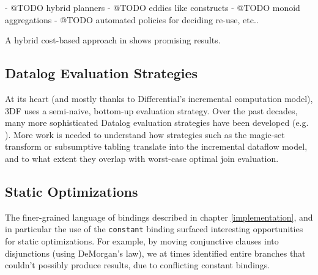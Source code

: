 \documentclass[../index.tex]{subfiles}
\begin{document}
- @TODO hybrid planners
- @TODO eddies like constructs
- @TODO monoid aggregations
- @TODO automated policies for deciding re-use, etc..

A hybrid cost-based approach in \cite{mhedhbi2019optimizing} shows
promising results.

\subsection{Datalog Evaluation Strategies}

At its heart (and mostly thanks to Differential's incremental
computation model), 3DF uses a semi-naive, bottom-up evaluation
strategy. Over the past decades, many more sophisticated Datalog
evaluation strategies have been developed
(e.g. \cite{tekle2011more}). More work is needed to understand how
strategies such as the magic-set transform or subsumptive tabling
translate into the incremental dataflow model, and to what extent they
overlap with worst-case optimal join evaluation.

\subsection{Static Optimizations}

The finer-grained language of bindings described in chapter
\ref{implementation}, and in particular the use of the
\texttt{constant} binding surfaced interesting opportunities for
static optimizations. For example, by moving conjunctive clauses into
disjunctions (using DeMorgan's law), we at times identified entire
branches that couldn't possibly produce results, due to conflicting
constant bindings.
\end{document}
